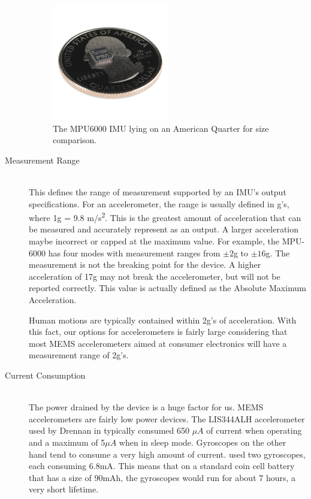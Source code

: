 \begin{description}
\begin{figure}
\begin{center}
\includegraphics[width=0.5\textwidth]{images/MPU6000Size.jpg}
\caption{The MPU6000 IMU lying on an American Quarter for size comparison.}
\label{fig:MPU6000Size}
\end{center}
\end{figure}

\hspace{2em}
\item[Measurement Range] \hfill \\
This defines the range of measurement supported by an IMU's output specifications. For an accelerometer, the range is usually defined in g's, where 1g = 9.8 m/s\textsuperscript{2}. This is the greatest amount of acceleration that can be measured and accurately represent as an output. A larger acceleration maybe incorrect or capped at the maximum value. For example, the MPU-6000 has four modes with measurement ranges from $\pm{2}$g to $\pm{16}$g. The measurement is not the breaking point for the device. A higher acceleration of 17g may not break the accelerometer, but will not be reported correctly. This value is actually defined as the Absolute Maximum Acceleration.
 
Human motions are typically contained within 2g's of acceleration. With this fact, our options for accelerometers is fairly large considering that most MEMS accelerometers aimed at consumer electronics will have a measurement range of 2g's. 
\hfill 
\item[Current Consumption] \hfill \\
The power drained by the device is a huge factor for us. MEMS accelerometers are fairly low power devices. The LIS344ALH accelerometer used by Drennan in \cite{drennan2010assessment} typically consumed 650 $\mu{A}$ of current when operating and a maximum of 5$\mu{A}$ when in sleep mode. Gyroscopes on the other hand tend to consume a very high amount of current. \cite{drennan2010assessment} used two gyroscopes, each consuming 6.8mA. This means that on a standard coin cell battery that has a size of 90mAh, the gyroscopes would run for about 7 hours, a very short lifetime.


\end{description}
